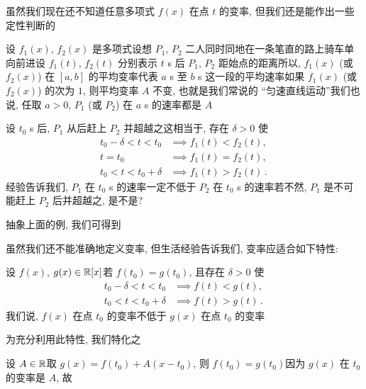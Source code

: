 虽然我们现在还不知道任意多项式 $f(x)$ 在点 $t$ 的变率, 但我们还是能作出一些定性判断的\period

\begin{example}
    设 $f_1 (x)$, $f_2 (x)$ 是多项式\period 设想 $P_1$, $P_2$ 二人同时同地在一条笔直的路上骑车单向前进\period 设 $f_1 (t)$, $f_2 (t)$ 分别表示 $t$ s 后 $P_1$, $P_2$ 距始点的距离\period 所以, $f_1 (x)$ (或 $f_2 (x)$) 在 $[a, b]$ 的平均变率代表 $a$ s 至 $b$ s 这一段的平均速率\period 如果 $f_1 (x)$ (或 $f_2 (x)$) 的次为 $1$, 则平均变率 $A$ 不变, 也就是我们常说的 ``匀速直线运动''\period 我们也说, 任取 $a > 0$, $P_1$ (或 $P_2$) 在 $a$ s 的速率都是 $A$\period

    设 $t_0$ s 后, $P_1$ 从后赶上 $P_2$ 并超越之\period 这相当于, 存在 $\delta > 0$ 使
    \begin{align*}
        t_0 - \delta < t < t_0 & \implies f_1 (t) < f_2 (t),        \\
        t = t_0                & \implies f_1 (t) = f_2 (t),        \\
        t_0 < t < t_0 + \delta & \implies f_1 (t) > f_2 (t) \period
    \end{align*}
    经验告诉我们, $P_1$ 在 $t_0$ s 的速率一定不低于 $P_2$ 在 $t_0$ s 的速率\period 若不然, $P_1$ 是不可能赶上 $P_2$ 后并超越之, 是不是?
\end{example}

抽象上面的例, 我们可得到

\begin{proposition}
    虽然我们还不能准确地定义变率, 但生活经验告诉我们, 变率应适合如下特性:

    设 $f (x)$, $g (x) \in \mathbb{R}[x]$\period 若 $f (t_0) = g (t_0)$, 且存在 $\delta > 0$ 使
    \begin{align*}
        t_0 - \delta < t < t_0 & \implies f (t) < g (t),        \\
        t_0 < t < t_0 + \delta & \implies f (t) > g (t) \period
    \end{align*}
    我们说, $f (x)$ 在点 $t_0$ 的变率不低于 $g (x)$ 在点 $t_0$ 的变率\period
\end{proposition}

为充分利用此特性, 我们特化之\period

设 $A \in \mathbb{R}$\period 取 $g(x) = f(t_0) + A (x - t_0)$, 则 $f(t_0) = g(t_0)$\period 因为 $g(x)$ 在 $t_0$ 的变率是 $A$, 故

